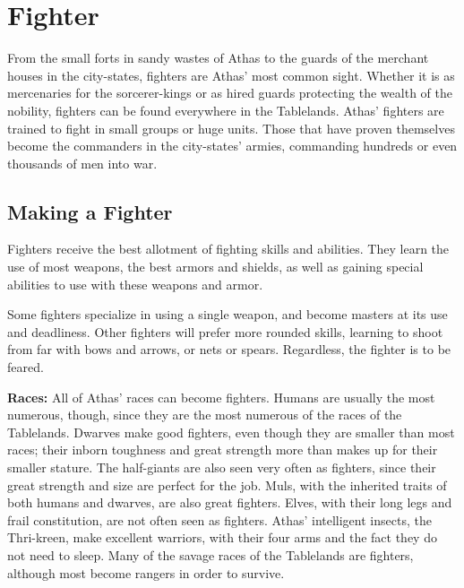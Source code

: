 \section{Fighter}

From the small forts in sandy wastes of Athas to the guards of the merchant houses in the city-states, fighters are Athas' most common sight. Whether it is as mercenaries for the sorcerer-kings or as hired guards protecting the wealth of the nobility, fighters can be found everywhere in the Tablelands. Athas' fighters are trained to fight in small groups or huge units. Those that have proven themselves become the commanders in the city-states' armies, commanding hundreds or even thousands of men into war.

\subsection{Making a Fighter}

Fighters receive the best allotment of fighting skills and abilities. They learn the use of most weapons, the best armors and shields, as well as gaining special abilities to use with these weapons and armor.

Some fighters specialize in using a single weapon, and become masters at its use and deadliness. Other fighters will prefer more rounded skills, learning to shoot from far with bows and arrows, or nets or spears. Regardless, the fighter is to be feared.

\textbf{Races:} All of Athas' races can become fighters. Humans are usually the most numerous, though, since they are the most numerous of the races of the Tablelands. Dwarves make good fighters, even though they are smaller than most races; their inborn toughness and great strength more than makes up for their smaller stature. The half-giants are also seen very often as fighters, since their great strength and size are perfect for the job. Muls, with the inherited traits of both humans and dwarves, are also great fighters. Elves, with their long legs and frail constitution, are not often seen as fighters. Athas' intelligent insects, the Thri-kreen, make excellent warriors, with their four arms and the fact they do not need to sleep. Many of the savage races of the Tablelands are fighters, although most become rangers in order to survive.

